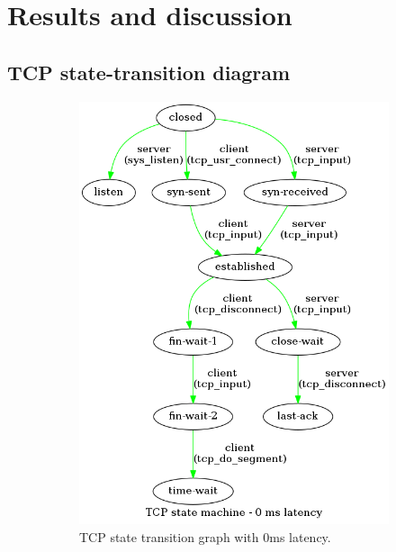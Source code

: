 \documentclass[a4paper,10pt]{article}
\begin{document}
\section{Results and discussion}

\subsection{TCP state-transition diagram}
\begin{figure}[]
\begin{subfigure}{.30\textwidth}
    \centering
    \includegraphics[width=\textwidth]{images/TCP_state_machine_0_ms.png}
    \caption{TCP state transition graph with 0ms latency.}
    \label{fig:0ms_latency}
\end{subfigure}%
\qquad
\begin{subfigure}{.30\textwidth}
   \centering

\end{subfigure}
\end{figure}
\end{document}
